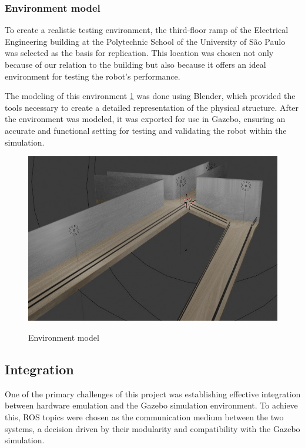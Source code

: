 \documentclass[../../monografia.tex]{subfiles}
\begin{document}
\subsubsection{Environment model}

To create a realistic testing environment, the third-floor ramp of the Electrical Engineering building  at the Polytechnic School of the University of São Paulo was selected as the basis for replication. This location was chosen not only because of our relation to the building but also because it offers an ideal environment for testing the robot’s performance.

The modeling of this environment \ref{fig: Environment model} was done using Blender, which provided the tools necessary to create a detailed representation of the physical structure. After the environment was modeled, it was exported for use in Gazebo, ensuring an accurate and functional setting for testing and validating the robot within the simulation.

\begin{figure}[h!]
    \caption{Environment model}
    \centering
    \includegraphics[width=16cm]{src/images/ThirdFloor.jpeg}
    \label{fig: Environment model}
\end{figure}

\subsection{Integration}

One of the primary challenges of this project was establishing effective integration between hardware emulation and the Gazebo simulation environment. To achieve this, ROS topics were chosen as the communication medium between the two systems, a decision driven by their modularity and compatibility with the Gazebo simulation.
\end{document}
